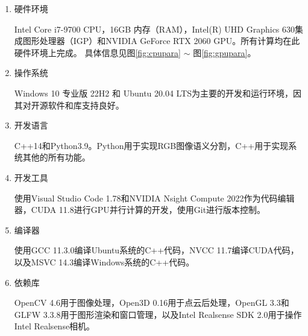 \begin{enumerate}
	\item{硬件环境}
	\par Intel Core i7-9700 CPU，16GB 内存（RAM），Intel(R) UHD Graphics 630集成图形处理器（IGP）和NVIDIA GeForce RTX 2060 GPU。所有计算均在此硬件环境上完成。
	具体信息见图\ref{fig:cpupara} $\sim$ 图\ref{fig:gpupara}。

	\item{操作系统}
	\par Windows 10 专业版 22H2 和 Ubuntu 20.04 LTS为主要的开发和运行环境，因其对开源软件和库支持良好。

	\item{开发语言}
	\par C++14和Python3.9。Python用于实现RGB图像语义分割，C++用于实现系统其他的所有功能。

	\item{开发工具}
	\par 使用Visual Studio Code 1.78和NVIDIA Nsight Compute 2022作为代码编辑器，CUDA 11.8进行GPU并行计算的开发，使用Git进行版本控制。

	\item{编译器}
	\par 使用GCC 11.3.0编译Ubuntu系统的C++代码，NVCC 11.7编译CUDA代码，以及MSVC 14.3编译Windows系统的C++代码。

	\item{依赖库}
	\par OpenCV 4.6用于图像处理，Open3D 0.16用于点云后处理，OpenGL 3.3和GLFW 3.3.8用于图形渲染和窗口管理，以及Intel Realsense SDK 2.0用于操作Intel Realsense相机。
\end{enumerate}